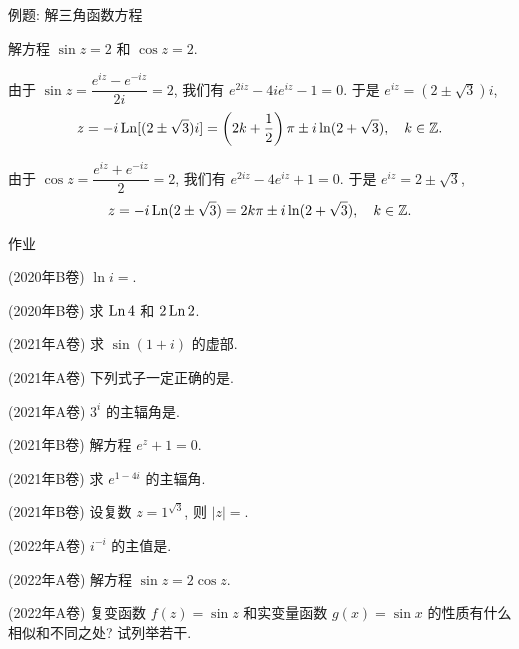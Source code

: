 \begin{frame}{例题: 解三角函数方程}
\begin{example}
解方程 $\sin z=2$ 和 $\cos z=2$.
\end{example}
\begin{solution}
\indent
由于 $\sin z=\dfrac{e^{iz}-e^{-iz}}{2i}=2$,
\onslide<+->
我们有 $e^{2iz}-4ie^{iz}-1=0$.
\onslide<+->
于是 $e^{iz}=(2\pm\sqrt 3)i$,
\onslide<+->
\vspace{-4pt}
\[z=-i\operatorname{Ln}[(2\pm\sqrt 3)i]=\left(2k+\frac12\right)\pi\pm i\ln(2+\sqrt3),\quad k\in{\mathbb{Z}}.\]
\vspace{-14pt}

\indent
\onslide<+->
由于 $\cos z=\dfrac{e^{iz}+e^{-iz}}2=2$,
\onslide<+->
我们有 $e^{2iz}-4e^{iz}+1=0$.
\onslide<+->
于是 $e^{iz}=2\pm\sqrt 3$,
\onslide<+->
\vspace{-4pt}
\[z=-i\operatorname{Ln}(2\pm\sqrt 3)=2k\pi\pm i\ln(2+\sqrt3),\quad k\in{\mathbb{Z}}.\]
\vspace{-14pt}
\end{solution}
\end{frame}


{
\homework
\begin{frame}[<*>]{作业}
  \begin{homeworks}
		\item(2020年B卷) $\ln i=$\fillblank{}.
		\item(2020年B卷) 求 $\operatorname{Ln} 4$ 和 $2\operatorname{Ln}2$.
    \item(2021年A卷) 求 $\sin(1+i)$ 的虚部.
		\item(2021年A卷) 下列式子一定正确的是\fillbrace.
    \item(2021年A卷) $3^i$ 的主辐角是\fillblank{}.
		\item(2021年B卷) 解方程 $e^z+1=0$.
		\item(2021年B卷) 求 $e^{1-4i}$ 的主辐角.
		\item(2021年B卷) 设复数 $z=1^{\sqrt3}$, 则 $|z|=$\fillblank{}.
    \item(2022年A卷) $i^{-i}$ 的主值是\fillblank{}.
    \item(2022年A卷) 解方程 $\sin z=2\cos z$.
    \item(2022年A卷) 复变函数 $f(z)=\sin z$ 和实变量函数 $g(x)=\sin x$ 的性质有什么相似和不同之处? 试列举若干.
  \end{homeworks}
\end{frame}
}